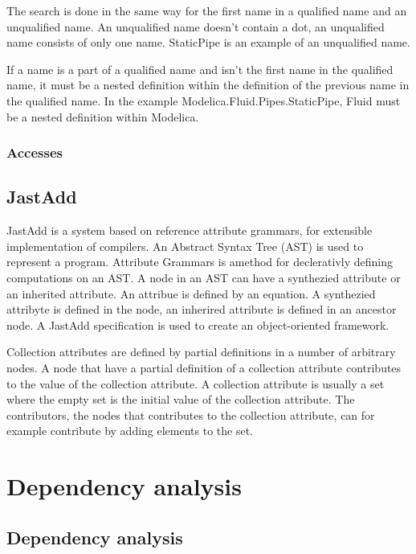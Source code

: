 \documentclass{cslthse-msc}
\begin{document}
The search is done in the same way for the first name in a qualified name and an unqualified name. An unqualified name doesn't contain a dot, an unqualified name consists of only one name. StaticPipe is an example of an unqualified name.

If a name is a part of a qualified name and isn't the first name in the qualified name, it must be a nested definition within the definition of the previous name in the qualified name. In the example Modelica.Fluid.Pipes.StaticPipe, Fluid must be a nested definition within Modelica.\cite{modelicamodelica, tillermodelica}

\subsection{Accesses}

\section{JastAdd}
JastAdd is a system based on reference attribute grammars, for extensible implementation of compilers. An Abstract Syntax Tree (AST) is used to represent a program. Attribute Grammars is amethod for declerativly defining computations on an AST. A node in an AST can have a synthezied attribute or an inherited attribute. An attribue is defined by an equation. A synthezied attribyte is defined in the node, an inherired attribute is defined in an ancestor node. A JastAdd specification is used to create an object-oriented framework.~\cite{aakesson2008development}

Collection attributes are defined by partial definitions in a number of arbitrary nodes. A node that have a partial definition of a collection attribute contributes to the value of the collection attribute. A collection attribute is usually a set where the empty set is the initial value of the collection attribute. The contributors, the nodes that contributes to the collection attribute, can for example contribute by adding elements to the set.~\cite{magnusson2007extending}

\chapter[Dependency analysis]{Dependency analysis}

\section{Dependency analysis}
\end{document}
